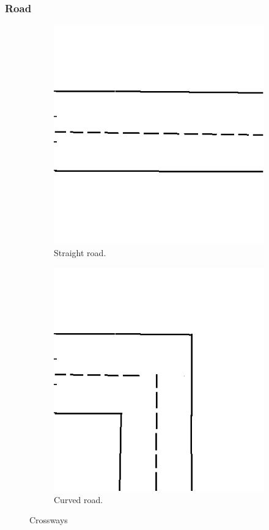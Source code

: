 \subsubsection{Road}
\begin{figure}
	\centering
	\begin{subfigure}{.5\textwidth}
		\centering
		\includegraphics{figures/laneaa.png}
		\caption{Straight road.}
		\label{fig:strr}
	\end{subfigure}%
	\begin{subfigure}{.5\textwidth}
		\centering
		\includegraphics{figures/lanebb.png}
		\caption{Curved road.}
		\label{fig:curvedr}
	\end{subfigure}
	\caption{Crossways}
	\label{fig:road}
\end{figure}

